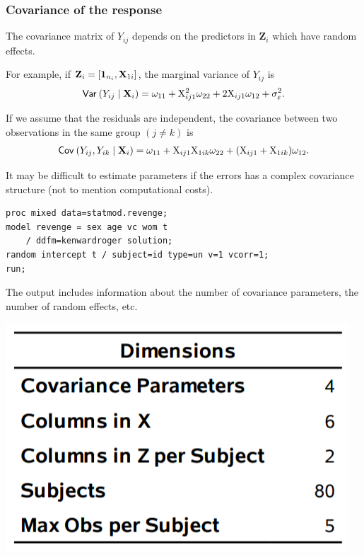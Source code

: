 \documentclass{beamer}
\begin{document}
\begin{frame}
\frametitle{Covariance of the response}
\bi
\item The covariance matrix of $Y_{ij}$ depends on the predictors in $\mathbf{Z}_i$ which have random effects.
\item For example, if $\mathbf{Z}_{i} = [\boldsymbol {1}_{n_i}, \mathbf{X}_{1i}]$, the marginal variance of $Y_{ij}$ is
\begin{align*}
{\mathsf{Var}_{}}\left(Y_{ij}\mid \mathbf{X}_i\right)=\omega_{11}+\mathrm{X}_{ij1}^2 \omega_{22} + 2\mathrm{X}_{ij1} \omega_{12}+\sigma^2_{\varepsilon}.
\end{align*}
\item If we assume that the residuals are independent, the covariance between two observations in the same group $(j\neq k)$ is
\begin{align*}
{\mathsf{Cov}_{}}\left(Y_{ij}, Y_{ik}\mid \mathbf{X}_i\right)=\omega_{11}+\mathrm{X}_{ij1}\mathrm{X}_{1ik}\omega_{22}+(\mathrm{X}_{ij1}+\mathrm{X}_{1ik})\omega_{12}.
\end{align*}
\item It may be difficult to estimate parameters if the errors has a complex covariance structure (not to mention computational costs).
\ei
\end{frame}

\begin{frame}[fragile]
\begin{tcolorbox}[colback=white, colframe=hecblue, title=\SASlang{} code for random intercept model]
\begin{verbatim}
proc mixed data=statmod.revenge;
model revenge = sex age vc wom t 
    / ddfm=kenwardroger solution;
random intercept t / subject=id type=un v=1 vcorr=1;
run;
\end{verbatim}
\end{tcolorbox}
The output includes information about the number of covariance parameters, the number of random effects, etc.
\begin{center}
\includegraphics[width = 0.35\linewidth]{img/c6/slides7-e23}
\end{center}
\end{frame}
%  
\end{document}
